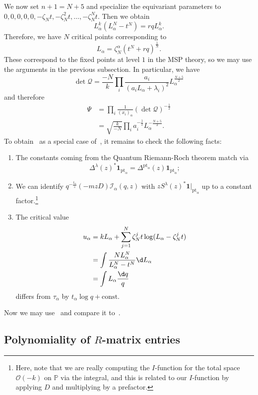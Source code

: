\documentclass[10pt]{amsart}
\theoremstyle{definition}
\theoremstyle{remark}
\theoremstyle{plain}
\theoremstyle{definition}
\theoremstyle{remark}
\renewcommand{\P}{\mathbb{P}}
\newcommand{\msc}[1]{\mathscr{#1}}
\newcommand{\mbf}[1]{\mathbf{#1}}
\newcommand{\mr}[1]{\mathrm{#1}}
\newcommand{\1}{\mathbf{1}}
\newcommand{\2}{\mathbf{2}}
\newcommand{\3}{\mathbf{3}}
\newcommand{\pt}{\mr{pt}}
\numberwithin{equation}{section}
\begin{document}
We now set $n+1 = N+5$ and specialize the equivariant parameters to $0,0,0,0,0,-\zeta_N t, -\zeta_N^2 t, \ldots, -\zeta_N^N t$. Then we obtain
\[ L_{\alpha}^k(L_{\alpha}^N - t^N) = r q L_{\alpha}^k. \]
Therefore, we have $N$ critical points corresponding to
\[ L_{\alpha} = \zeta_N^{\alpha}(t^N + rq)^{\frac{1}{N}}. \]
These correspond to the fixed points at level $1$ in the MSP theory, so we may use the arguments in the previous subsection. In particular, we have
\[ \det \msc{Q} = \frac{-N}{k} \prod_i \frac{a_i}{(a_i L_{\alpha} + \lambda_i)^2} L_{\alpha}^{\frac{N+5}{2}} \]
and therefore
\begin{align*}
    \Psi &= \prod_i \frac{1}{(x_i)_{\alpha}} (\det \msc{Q})^{-\frac{1}{2}} \\
    &= \sqrt{\frac{k}{-N}} \prod_i a_i^{-\frac{1}{2}} L_{\alpha}^{-\frac{N+5}{2}}.
\end{align*}
To obtain~ as a special case of~, it remains to check the following facts:
\begin{enumerate}
    \item The constants coming from the Quantum Riemann-Roch theorem match via 
        \[\Delta^{\lambda}(z)^* \mbf{1}_{\pt_{\alpha}} = \Delta^{\pt_{\alpha}}(z) \mbf{1}_{\pt_{\alpha}}; \]
    \item We can identify $q^{-\frac{t_{\alpha}}{z}}(-mzD) \msc{I}_{\alpha}(q,z)$ with $z S^{\lambda}(z)^* \mbf{1}|_{\pt_{\alpha}}$ up to a constant factor.\footnote{Here, note that we are really computing the $I$-function for the total space $\msc{O}(-k)$ on $\P$ via the integral, and this is related to our $I$-function by applying $D$ and multiplying by a prefactor.}
    \item The critical value
        \begin{align*}
            u_{\alpha} &= k L_{\alpha} + \sum_{j=1}^N \zeta_N^j t \log(L_{\alpha} - \zeta_N^j t) \\
            &= \int \frac{NL_{\alpha}^N}{L_{\alpha}^N - t^N} \d L_{\alpha} \\
            &= \int L_{\alpha} \frac{\d q}{q}
        \end{align*}
        differs from $\tau_{\alpha}$ by $t_{\alpha} \log q + \mr{const}$.
\end{enumerate}
Now we may use~ and compare it to~.


\subsection{Polynomiality of $R$-matrix entries}%
\label{sub:Polynomiality of R matrix entries}
\end{document}
